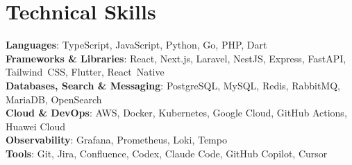 \section{Technical Skills}
 \begin{itemize}[leftmargin=0pt, label={}, topsep=0pt, parsep=0pt]
   \small{\item{
     \textbf{Languages}{: TypeScript, JavaScript, Python, Go, PHP, Dart} \\
     \textbf{Frameworks \& Libraries}{: React, Next.js, Laravel, NestJS, Express, FastAPI, Tailwind~CSS, Flutter, React~Native} \\
     \textbf{Databases, Search \& Messaging}{: PostgreSQL, MySQL, Redis, RabbitMQ, MariaDB, OpenSearch} \\
     \textbf{Cloud \& DevOps}{: AWS, Docker, Kubernetes, Google Cloud, GitHub Actions, Huawei Cloud} \\
     \textbf{Observability}{: Grafana, Prometheus, Loki, Tempo} \\
     \textbf{Tools}{: Git, Jira, Confluence, Codex, Claude Code, GitHub Copilot, Cursor} \\
   }}
 \end{itemize}
